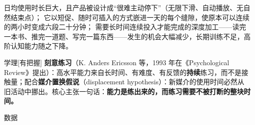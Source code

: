 \documentclass[prep,both]{debate}
\begin{document}
\begin{fields}
\begin{mechanism}[机制 （三步）]
\step 日均使用时长巨大，且产品被设计成“很难主动停下”（无限下滑、自动播放、无自然结束点）；
\step 它以短促、随时可插入的方式嵌进一天的每个缝隙，使原本可以连续的两小时变成六段二十分钟；
\step 需要长时间连续投入才能完成的深度加工——读完一本书、推完一道题、写完一篇东西——发生的机会大幅减少，长期训练不足，高阶认知能力随之下降。

\end{mechanism}
\begin{evidence}{学理}[有把握]
\textbf{刻意练习}（K. Anders Ericsson 等，1993 年在《Psychological Review》提出）：高水平能力来自长时间、有难度、有反馈的\textbf{持续}练习，而不是接触量；配合\textbf{媒介置换假说}（displacement hypothesis）：新媒介的使用时间必然从旧活动中挪出。核心主张一句话：\textbf{能力是练出来的，而练习需要不被打断的整块时间。}
\end{evidence}
\begin{evidence}{数据}


\end{evidence}
\end{fields}
\end{document}

